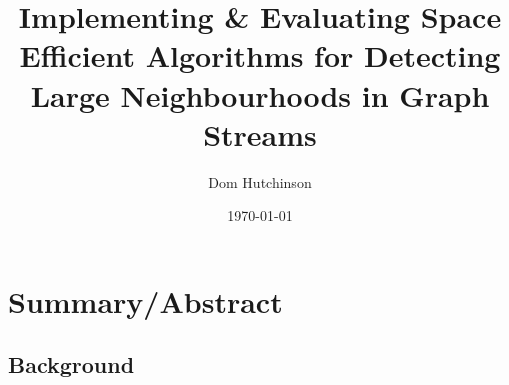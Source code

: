 \documentclass[11pt,twoside,a4paper]{report}
\begin{document}
\renewcommand{\headrulewidth}{0pt}
\newcommand{\ie}{\textit{i.e.} }
\newcommand{\nats}{\mathbb{N} }
\newcommand{\horizontalline}{\newline\vspace{.3cm}\hfill\makebox[.5\linewidth]{\rule{.5\textwidth}{0.4pt}}\hfill\vspace{.05cm}}

\renewcommand\thetable{\arabic{table}} %
\renewcommand\thefigure{\arabic{figure}} %


\pagestyle{fancy}
\fancyhead[C]{}
\fancyhead[R]{\today}

\DontPrintSemicolon

\title{Implementing \& Evaluating Space Efficient Algorithms for Detecting Large Neighbourhoods in Graph Streams}
\author{Dom Hutchinson}
\date{\today}
\maketitle
\newpage

\tableofcontents
\newpage

\renewcommand\thechapter{\Roman{chapter}}
\renewcommand\thesection{\thechapter.\roman{section}}
\setcounter{chapter}{1}
\chapter*{Summary/Abstract}

\section{Background}


\end{document}
